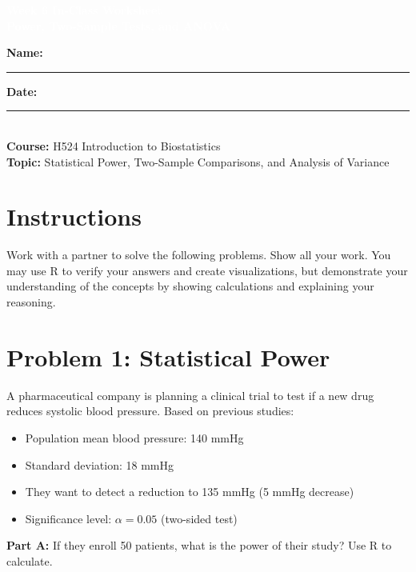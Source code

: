 \documentclass[11pt]{article}
\title{}
\author{}
\date{}
\begin{document}
\begin{tcolorbox}[colback=osaorange,colframe=black,boxrule=2pt,arc=0pt,left=6pt,right=6pt,top=10pt,bottom=10pt]
\centering
\textcolor{white}{\textbf{\Large Week 6 In-Class Worksheet}}\\
\textcolor{white}{\textbf{\large Power, Two-Sample Tests, and ANOVA}}
\end{tcolorbox}

\vspace{8pt}

\noindent\textbf{Name:} \rule{8cm}{0.4pt} \hfill \textbf{Date:} \rule{4cm}{0.4pt}\\[0.5ex]
\textbf{Course:} H524 Introduction to Biostatistics\\
\textbf{Topic:} Statistical Power, Two-Sample Comparisons, and Analysis of Variance

\vspace{8pt}

\section*{Instructions}
Work with a partner to solve the following problems. Show all your work. You may use R to verify your answers and create visualizations, but demonstrate your understanding of the concepts by showing calculations and explaining your reasoning.

\vspace{12pt}

\section{Problem 1: Statistical Power}

A pharmaceutical company is planning a clinical trial to test if a new drug reduces systolic blood pressure. Based on previous studies:
\begin{itemize}
\item Population mean blood pressure: 140 mmHg
\item Standard deviation: 18 mmHg
\item They want to detect a reduction to 135 mmHg (5 mmHg decrease)
\item Significance level: $\alpha = 0.05$ (two-sided test)
\end{itemize}

\vspace{6pt}

\textbf{Part A:} If they enroll 50 patients, what is the power of their study? Use R to calculate.
\end{document}
